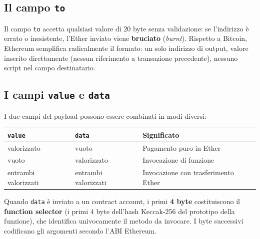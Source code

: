 \documentclass[
  italian,
  openany]{book}
\newcounter{none} %
\begin{document}
\subsection{\texorpdfstring{Il campo
\texttt{to}}{Il campo to}}\label{il-campo-to}

Il campo \texttt{to} accetta qualsiasi valore di 20 byte senza
validazione: se l'indirizzo è errato o inesistente, l'Ether inviato
viene \textbf{bruciato} (\emph{burnt}). Rispetto a Bitcoin, Ethereum
semplifica radicalmente il formato: un solo indirizzo di output, valore
inserito direttamente (nessun riferimento a transazione precedente),
nessuno script nel campo destinatario.

\subsection{\texorpdfstring{I campi \texttt{value} e
\texttt{data}}{I campi value e data}}\label{i-campi-value-e-data}

I due campi del payload possono essere combinati in modi diversi:

{\def\LTcaptype{none} %
\begin{longtable}[]{@{}
  >{\raggedright\arraybackslash}p{}
  >{\raggedright\arraybackslash}p{}
  >{\raggedright\arraybackslash}p{}@{}}
\toprule\noalign{}
\begin{minipage}[b]{\linewidth}\raggedright
\texttt{value}
\end{minipage} & \begin{minipage}[b]{\linewidth}\raggedright
\texttt{data}
\end{minipage} & \begin{minipage}[b]{\linewidth}\raggedright
Significato
\end{minipage} \\
\midrule\noalign{}
\endhead
\bottomrule\noalign{}
\endlastfoot
valorizzato & vuoto & Pagamento puro in Ether \\
vuoto & valorizzato & Invocazione di funzione \\
entrambi valorizzati & entrambi valorizzati & Invocazione con
trasferimento Ether \\
\end{longtable}
}

Quando \texttt{data} è inviato a un contract account, i primi \textbf{4
byte} costituiscono il \textbf{function selector} (i primi 4 byte
dell'hash Keccak-256 del prototipo della funzione), che identifica
univocamente il metodo da invocare. I byte successivi codificano gli
argomenti secondo l'ABI Ethereum.
\end{document}
